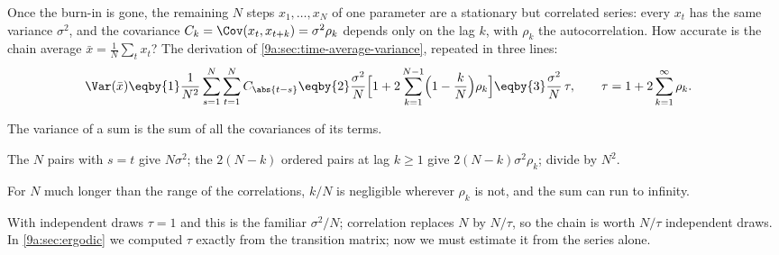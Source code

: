 Once the burn-in is gone, the remaining $N$ steps $x_1,\dots,x_N$ of one parameter are a
stationary but correlated series: every $x_t$ has the same variance $\sigma^2$, and the covariance
$C_k=\Cov(x_t,x_{t+k})=\sigma^2\rho_k$ depends only on the lag $k$, with $\rho_k$ the
autocorrelation. How accurate is the chain average $\bar x=\frac1N\sum_tx_t$? The derivation of
\cref{9a:sec:time-average-variance}, repeated in three lines:
\begin{align}
  \Var(\bar x)
  &\eqby{1}\frac1{N^2}\sum_{s=1}^N\sum_{t=1}^NC_{\abs{t-s}}
   \eqby{2}\frac{\sigma^2}{N}\Bigl[1+2\sum_{k=1}^{N-1}\Bigl(1-\frac kN\Bigr)\rho_k\Bigr]
   \eqby{3}\frac{\sigma^2}{N}\,\tau,
  \qquad
  \tau=1+2\sum_{k=1}^\infty\rho_k .
  \label{9b:eq:var-mean-recall}
\end{align}
\begin{explain}
  \item The variance of a sum is the sum of all the covariances of its terms.
  \item The $N$ pairs with $s=t$ give $N\sigma^2$; the $2(N-k)$ ordered pairs at lag $k\ge1$ give
        $2(N-k)\sigma^2\rho_k$; divide by $N^2$.
  \item For $N$ much longer than the range of the correlations, $k/N$ is negligible wherever
        $\rho_k$ is not, and the sum can run to infinity.
\end{explain}
With independent draws $\tau=1$ and this is the familiar $\sigma^2/N$; correlation replaces $N$ by
$N/\tau$, so the chain is worth $N/\tau$ independent draws. In \cref{9a:sec:ergodic} we computed
$\tau$ exactly from the transition matrix; now we must estimate it from the series alone.

